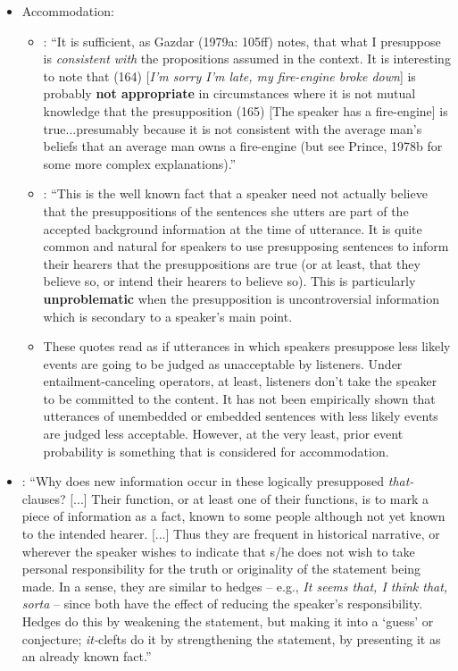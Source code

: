 \documentclass[11pt,fleqn]{article}
\newcommand{\6}{\mbox{$[\hspace*{-.6mm}[$}}
\newcommand{\9}{\mbox{$]\hspace*{-.6mm}]$}}
\begin{document}
\begin{itemize}
\begin{itemize}
\begin{itemize}
\end{itemize}

\item Accommodation:

\begin{itemize}

\item \citealt[205]{levinson83}: ``It is sufficient, as Gazdar (1979a: 105ff) notes, that what I presuppose is {\em consistent with} the propositions assumed in the context. It is interesting to note that (164) [{\em I'm sorry I'm late, my fire-engine broke down}] is probably {\bf not appropriate} in circumstances where it is not mutual knowledge that the presupposition (165) [The speaker has a fire-engine] is true...presumably because it is not consistent with the average man's beliefs that an average man owns a fire-engine (but see Prince, 1978b for some more complex explanations).''

\item \citealt[252]{simons2003}: ``This is the well known fact that a speaker need not actually believe that the presuppositions of the sentences she utters are part of the accepted background information at the time of utterance. It is quite common and natural for speakers to use presupposing sentences to inform their hearers that the presuppositions are true (or at least, that they believe so, or intend their hearers to believe so). This is particularly {\bf unproblematic} when the presupposition is uncontroversial information which is secondary to a speaker’s main point.

\item These quotes read as if utterances in which speakers presuppose less likely events are going to be judged as unacceptable by listeners. Under entailment-canceling operators, at least, listeners don't take the speaker to be committed to the content. It has not been empirically shown that utterances of unembedded or embedded sentences with less likely events are judged less acceptable. However, at the very least, prior event probability is something that is considered for accommodation.

\end{itemize}

\item \citealt[899]{prince1978}: ``Why does new information occur in these logically presupposed {\em that-}clauses? [...] Their function, or at least one of their functions, is to mark a piece of information as a fact, known to some people although not yet known to the intended hearer. [...] Thus they are frequent in historical narrative, or wherever the speaker wishes to indicate that s/he does not wish to take personal responsibility for the truth or originality of the statement being made. In a sense, they are similar to hedges -- e.g., {\em It seems that, I think that, sorta} -- since both have the effect of reducing the speaker's responsibility. Hedges do this by weakening the statement, but making it into a `guess' or conjecture; {\em it-}clefts do it by strengthening the statement, by presenting it as an already known fact.''



\end{itemize}
\end{itemize}
\end{document}
